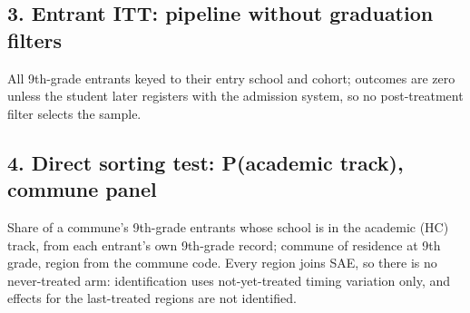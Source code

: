 \documentclass[
]{article}
\begin{document}
\hypertarget{entrant-itt-pipeline-without-graduation-filters}{%
\subsection{3. Entrant ITT: pipeline without graduation
filters}\label{entrant-itt-pipeline-without-graduation-filters}}

All 9th-grade entrants keyed to their entry school and cohort; outcomes
are zero unless the student later registers with the admission system,
so no post-treatment filter selects the sample.

\begin{table}[htbp]
   \caption{Entrant-ITT Pipeline by Gender with Within-Class Gap}\label{tab: gap entrant itt}
   \centerline{}
\end{table}

\hypertarget{direct-sorting-test-pacademic-track-commune-panel}{%
\subsection{4. Direct sorting test: P(academic track), commune
panel}\label{direct-sorting-test-pacademic-track-commune-panel}}

Share of a commune's 9th-grade entrants whose school is in the academic
(HC) track, from each entrant's own 9th-grade record; commune of
residence at 9th grade, region from the commune code. Every region joins
SAE, so there is no never-treated arm: identification uses
not-yet-treated timing variation only, and effects for the last-treated
regions are not identified.
\end{document}
